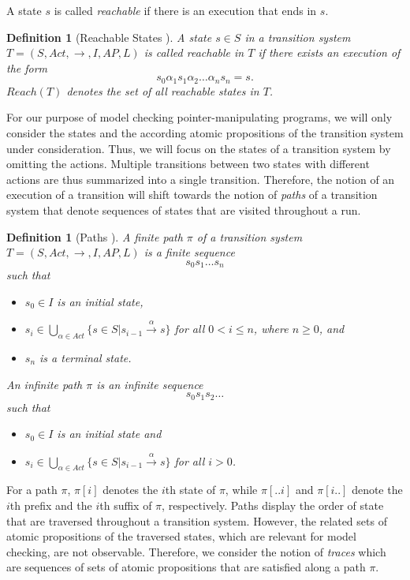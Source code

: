 \documentclass[a4paper, 12pt, twoside]{report}
\theoremstyle{plain}
\newtheorem{definition}[theorem]{Definition}
\begin{document}
	A state $s$ is called \textit{reachable} if there is an execution that ends in $s$.
	
	\begin{definition}[Reachable States \cite{baier2008principles}]\label{def:reachable_state}
		A state $s \in S$ in a transition system $T=(S, Act, \rightarrow, I, AP, L)$ is called \textup{reachable} in $T$ if there exists an execution of the form \[s_0 \alpha_1 s_1 \alpha_2 \dots \alpha_n s_n = s.\]
		$Reach(T)$ denotes the set of all reachable states in $T$.
	\end{definition}

	For our purpose of model checking pointer-manipulating programs, we will only consider the states and the according atomic propositions of the transition system under consideration. Thus, we will focus on the states of a transition system by omitting the actions. Multiple transitions between two states with different actions are thus summarized into a single transition. Therefore, the notion of an execution of a transition will shift towards the notion of \textit{paths} of a transition system that denote sequences of states that are visited throughout a run.	 
	 
	\begin{definition}[Paths \cite{baier2008principles}]\label{def:paths}
		A \textup{finite path} $\pi$ of a transition system $T=(S, Act, \rightarrow, I, AP, L)$ is a finite sequence \[s_0 s_1 \dots s_n\] such that 
		\begin{itemize}
			\item $s_0 \in I$ is an initial state, 
			\item $s_i \in \bigcup_{\alpha \in Act} \{s\in S | s_{i-1} \xrightarrow{\alpha} s\}$ for all $0<i\leq n$, where $n \geq 0$, and 
			\item $s_n$ is a terminal state.
		\end{itemize} 
		An \textup{infinite path} $\pi$ is an infinite sequence \[s_0 s_1 s_2 \dots\] such that 
		\begin{itemize}
			\item $s_0 \in I$ is an initial state and 
			\item $s_i \in \bigcup_{\alpha \in Act} \{s\in S | s_{i-1} \xrightarrow{\alpha} s\}$ for all $i > 0$.
		\end{itemize}
	\end{definition}

	For a path $\pi$, $\pi[i]$ denotes the $i$th state of $\pi$, while $\pi[..i]$ and $\pi[i..]$ denote the $i$th prefix and the $i$th suffix of $\pi$, respectively. Paths display the order of state that are traversed throughout a transition system. However, the related sets of atomic propositions of the traversed states, which are relevant for model checking, are not observable. Therefore, we consider the notion of \textit{traces} which are sequences of sets of atomic propositions that are satisfied along a path $\pi$.
	
\end{document}
